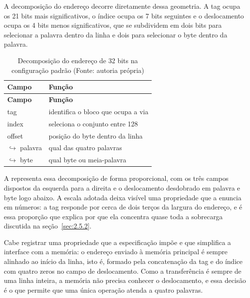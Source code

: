 A decomposição do endereço decorre diretamente dessa geometria. A tag ocupa os 21 bits mais significativos, o índice ocupa os 7 bits seguintes e o deslocamento ocupa os 4 bits menos significativos, que se subdividem em dois bits para selecionar a palavra dentro da linha e dois para selecionar o byte dentro da palavra.

{\small
\begin{longtable}{@{}>{\raggedright\arraybackslash}p{}>{\raggedright\arraybackslash}p{}@{}}
\caption[Decomposição do endereço de 32 bits na configuração padrão]{Decomposição do endereço de 32 bits na configuração padrão (Fonte: autoria própria)}\label{tab:4.3}\\
\hline
\textbf{Campo} & \textbf{Função} \\
\hline
\endfirsthead
\hline
\textbf{Campo} & \textbf{Função} \\
\hline
\endhead
\hline
\endlastfoot
tag & identifica o bloco que ocupa a via \\
index & seleciona o conjunto entre 128 \\
offset & posição do byte dentro da linha \\
$\hookrightarrow$ palavra & qual das quatro palavras \\
$\hookrightarrow$ byte & qual byte ou meia-palavra \\
\end{longtable}
}

A  representa essa decomposição de forma proporcional, com os três campos dispostos da esquerda para a direita e o deslocamento desdobrado em palavra e byte logo abaixo. A escala adotada deixa visível uma propriedade que a  enuncia em números: a tag responde por cerca de dois terços da largura do endereço, e é essa proporção que explica por que ela concentra quase toda a sobrecarga discutida na seção~\ref{sec:2.5.2}.


Cabe registrar uma propriedade que a especificação impõe e que simplifica a interface com a memória: o endereço enviado à memória principal é sempre alinhado ao início da linha, isto é, formado pela concatenação da tag e do índice com quatro zeros no campo de deslocamento. Como a transferência é sempre de uma linha inteira, a memória não precisa conhecer o deslocamento, e essa decisão é o que permite que uma única operação atenda a quatro palavras.


